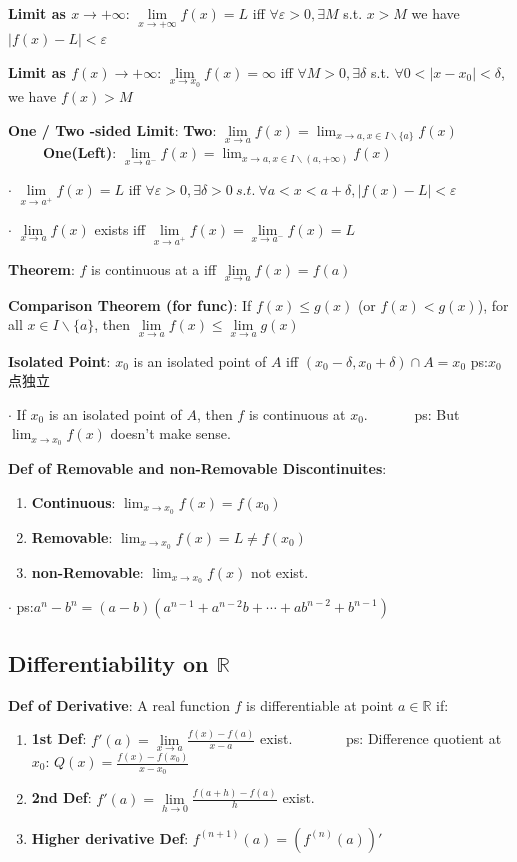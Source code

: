 \documentclass[11pt]{article}
\begin{document}
\textbf{Limit as $x\to +\infty$}: $\lim\limits_{x\to +\infty}f(x)=L$ iff $\forall\varepsilon>0,\exists M$ s.t. $x>M$ we have $|f(x)-L|<\varepsilon$

\textbf{Limit as $f(x)\to +\infty$}: $\lim\limits_{x\to x_0}f(x)=\infty$ iff $\forall M>0,\exists\delta$ s.t. $\forall 0<|x-x_0|<\delta$, we have $f(x)>M$

\textbf{One / Two -sided Limit}: \textbf{Two}: $\lim\limits_{x\to a}f(x)=\lim_{x\to a,x\in I \backslash \{a\}}f(x)$ \ \ \ \ \ \textbf{One(Left)}: $\lim\limits_{x\to a^-}f(x)=\lim_{x\to a,x\in I \backslash (a,+\infty)}f(x)$

$\cdot$ $\lim\limits_{x \to a^+}f(x)=L$ iff $\forall \varepsilon>0, \exists \delta>0 \ s.t. \ \forall a<x<a+\delta, |f(x)-L|<\varepsilon$

$\cdot$ $\lim\limits_{x\to a}f(x)$ exists iff $\lim\limits_{x \to a^+}f(x)=\lim\limits_{x \to a^-}f(x)=L$

\textbf{Theorem}: $f$ is continuous at a iff $\lim\limits_{x\to a}f(x)=f(a)$

\textbf{Comparison Theorem (for func)}: If $f(x)\leq g(x)$ (or $f(x)< g(x)$), for all $x\in I\backslash\{a\}$, then $\lim\limits_{x\to a}f(x)\leq \lim\limits_{x\to a}g(x)$

\textbf{Isolated Point}: $x_0$ is an isolated point of $A$ iff $(x_0-\delta,x_0+\delta)\cap A={x_0}$  ps:$x_0$点独立

$\cdot$ If $x_0$ is an isolated point of $A$, then $f$ is continuous at $x_0$. \ \ \ \ \ \ ps: But $\lim_{x\to x_0}f(x)$ doesn't make sense.

\textbf{Def of Removable and non-Removable Discontinuites}: 
\begin{enumerate}[itemsep=-2pt, topsep=-2pt]
    \item \textbf{Continuous}: $\lim_{x\to x_0}f(x)=f(x_0)$
    \item \textbf{Removable}: $\lim_{x\to x_0}f(x)=L\ne f(x_0)$
    \item \textbf{non-Removable}: $\lim_{x\to x_0}f(x)$ not exist.
\end{enumerate}

$\cdot$ ps:$a^n-b^n=(a-b)(a^{n-1}+a^{n-2}b+\cdots+ab^{n-2}+b^{n-1})$

\subsection{Differentiability on $\mathbb{R}$}

\textbf{Def of Derivative}: A real function $f$ is differentiable at point $a\in \mathbb{R}$ if:
\begin{enumerate}[itemsep=-2pt, topsep=-2pt]
    \item \textbf{1st Def}: $f'(a)=\lim\limits_{x\to a}\frac{f(x)-f(a)}{x-a}$ exist. \ \ \ \ \ \ \ ps: Difference quotient at $x_0$: $Q(x)=\frac{f(x)-f(x_0)}{x-x_0}$
    \item \textbf{2nd Def}: $f'(a)=\lim\limits_{h\to 0}\frac{f(a+h)-f(a)}{h}$ exist.
    \item \textbf{Higher derivative Def}: $f^{(n+1)}(a)=(f^{(n)}(a))'$
\end{enumerate}
\end{document}
